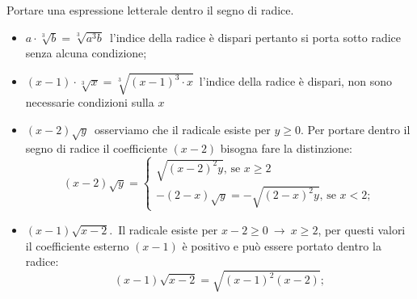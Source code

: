 \begin{exrig}
 \begin{esempio}
 Portare una espressione letterale dentro il segno di radice.
 \begin{itemize}
 \item $a\cdot \sqrt[3]b=\sqrt[3]{a^3b}$\, l'indice della radice è dispari 
  pertanto si porta sotto radice senza alcuna condizione;
 \item $(x-1)\cdot \sqrt[3]x=\sqrt[3]{(x-1)^3\cdot x}$\, l'indice della radice 
  è dispari, non sono necessarie condizioni sulla $x$
 \item $(x-2)\sqrt y$\, osserviamo che il radicale esiste per $y\ge 0$.
  Per portare dentro il segno di radice il coefficiente $(x-2)$ bisogna fare 
  la distinzione:
 \[
 (x-2)\sqrt y=\left\{\begin{array}{l}\sqrt{(x-2)^2y}\text{, se }x\ge 2\\
 -(2-x)\sqrt y=-\sqrt{(2-x)^2y}\text{, se }x<2;\end{array}\right.
 \]
 \item $(x-1)\sqrt{x-2}$.\, Il radicale esiste per $x-2\ge 0\ \to \ x\ge 2$, 
 per questi valori il coefficiente esterno $(x-1)$ è positivo e può essere 
 portato dentro la radice: \[(x-1)\sqrt{x-2}=\sqrt{(x-1)^2(x-2)};\]
% 
% 
% 
% 
 \end{itemize}
 \end{esempio}
\end{exrig}


